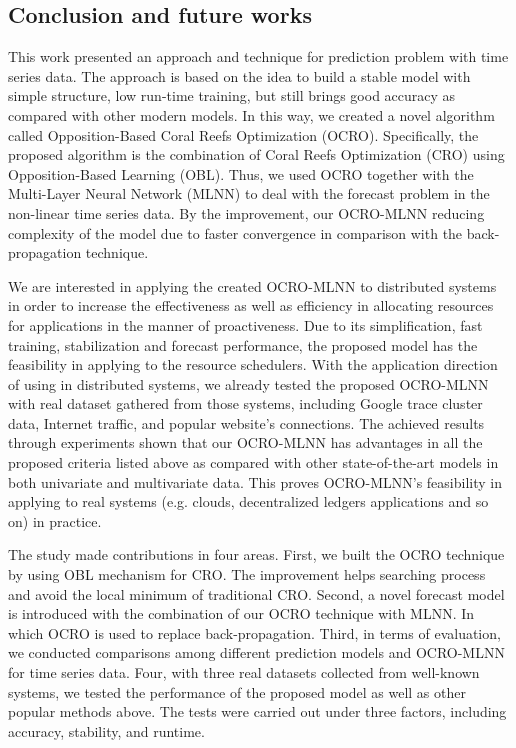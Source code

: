 \documentclass[11pt,twoside]{article}
\begin{document}
\begin{multicols}{2}
\section{Conclusion and future works}
\label{conclusion}
This work presented an approach and technique for prediction problem with time series data. The approach is based on the idea to build a stable model with simple structure, low run-time training, but still brings good accuracy as compared with other modern models. In this way, we created a novel algorithm called Opposition-Based Coral Reefs Optimization (OCRO). Specifically, the proposed algorithm is the combination of Coral Reefs Optimization (CRO) using Opposition-Based Learning (OBL). Thus, we used OCRO together with the Multi-Layer Neural Network (MLNN) to deal with the forecast problem in the non-linear time series data. By the improvement, our OCRO-MLNN reducing complexity of the model due to faster convergence in comparison with the back-propagation technique. 

We are interested in applying the created OCRO-MLNN to distributed systems in order to increase the effectiveness as well as efficiency in allocating resources for applications in the manner of proactiveness. Due to its simplification, fast training, stabilization and forecast performance, the proposed model has the feasibility in applying to the resource schedulers. With the application direction of using in distributed systems, we already tested the proposed OCRO-MLNN with real dataset gathered from those systems, including Google trace cluster data, Internet traffic, and popular website's connections. The achieved results through experiments shown that our OCRO-MLNN has advantages in all the proposed criteria listed above as compared with other state-of-the-art models in both univariate and multivariate data. This proves OCRO-MLNN's feasibility in applying to real systems (e.g. clouds, decentralized ledgers applications and so on) in practice.

The study made contributions in four areas. First, we built the OCRO technique by using OBL mechanism for CRO. The improvement helps searching process and avoid the local minimum of traditional CRO. Second, a novel forecast model is introduced with the combination of our OCRO technique with MLNN. In which OCRO is used to replace back-propagation. Third, in terms of evaluation, we conducted comparisons among different prediction models and OCRO-MLNN for time series data. Four, with three real datasets collected from well-known systems, we tested the performance of the proposed model as well as other popular methods above. The tests were carried out under three factors, including accuracy, stability, and runtime.


\end{multicols}
\end{document}
